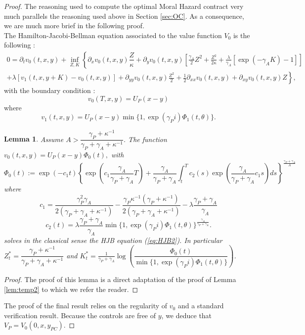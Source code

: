 \documentclass[numbook, envcountsect, envcountsame, envcountreset, runningheads, smallextended]{article}
\newtheorem{Lemma}{Lemma}[part]
\begin{document}
\begin{proof}


The reasoning used to compute the optimal Moral Hazard contract very much parallels the reasoning used above in Section \ref{sec:OC}. As a consequence, we are much more brief in the following proof.\\
The Hamilton-Jacobi-Bellman equation associated to the value function $V_0$ is the following : 
\begin{align}
\label{eq:HJB2}
0=\partial_t v_0(t,x,y) + \inf_{Z,K} \left\{ \partial_xv_0(t,x,y)\dfrac{Z}{\kappa} + \partial_yv_0(t,x,y) \left[\frac{\gamma_A}{2} Z^2 + \frac{Z^2}{2 \kappa}  + \frac{\lambda}{\gamma_A} [\exp(-\gamma_A K) - 1]\right] \right. \nonumber\\
\left.+ \lambda \left[ v_1(t,x,y+K) - v_0(t,x,y)\right]+ \partial_{yy} v_0(t,x,y) \frac{Z^2}{2} + \frac{1}{2} \partial_{xx} v_0(t,x,y)+ \partial_{xy}v_0(t,x,y) Z 
 \right\},
\end{align}
with the boundary condition :
$$v_0(T,x,y) = U_P(x-y)$$
where
$$v_1(t,x,y) =   U_P(x-y) \min \Big\{1, \exp(\gamma_Pi) \Phi_1(t, \theta)\Big\}. 
$$

\begin{Lemma}
\label{lem:temp10}
Assume $A> \dfrac{\gamma_P + \kappa^{-1}}{\gamma_P + \gamma_A + \kappa^{-1}}$. The function $v_0(t,x,y)=U_P(x-y) \Phi_0(t),$
with 
$$ \Phi_0(t) := \exp(-c_1 t) \left\{ \exp(c_1 \frac{\gamma_A}{\gamma_P + \gamma_A}T) + \frac{\gamma_A}{\gamma_P+\gamma_A} \int_t^T c_2(s) \exp(\frac{\gamma_A}{\gamma_P + \gamma_A} c_1 s) ds \right\}^{\frac{\gamma_P+\gamma_A}{A}}$$
where 
$$  c_1 = \frac{\gamma_P^2 \gamma_A}{2(\gamma_P+\gamma_A + \kappa^{-1}) } - \frac{\gamma_P \kappa^{-1}(\gamma_P+\kappa^{-1})}{2{(\gamma_P + \gamma_A + \kappa^{-1})}} - \lambda \frac{\gamma_P + \gamma_A}{\gamma_A} $$
 $$c_2(t) = \lambda \frac{\gamma_P + \gamma_A}{\gamma_A} \min \Big\{1, \exp(\gamma_Pi) \Phi_1(t, \theta)\Big\}^{\frac{\gamma_A}{\gamma_P+\gamma_A}}.$$
solves in the classical sense the HJB equation (\ref{eq:HJB2}). In particular $Z^*_t = \dfrac{\gamma_P + \kappa^{-1}}{\gamma_P + \gamma_A + \kappa^{-1}}$ and $K^*_t =\frac{1}{\gamma_P+\gamma_A}\log\left(\dfrac{\Phi_0(t)}{\min \Big\{1, \exp(\gamma_Pi) \Phi_1(t, \theta)\Big\}}\right)$.
\end{Lemma}
\begin{proof}
The proof of this lemma is a direct adaptation of the proof of Lemma \ref{lem:temp2} to which we refer the reader.
\end{proof}

The proof of the final result relies on the regularity of $v_0$ and a standard verification result. Because the controls are free of $y$, we deduce that $V_P=V_0(0,x,y_{PC}).$
\end{proof}
\end{document}

